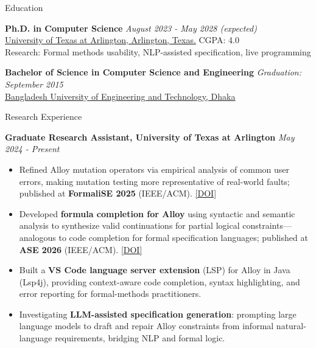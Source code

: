 \documentclass{resume} %
\begin{document}
\begin{rSection}{Education}

{\bf Ph.D. in Computer Science} \hfill {\em August 2023 - May 2028 (expected)}
\\ \href{https://www.uta.edu/academics/schools-colleges/engineering/academics/departments/cse}{University of Texas at Arlington, Arlington, Texas.} \hfill {CGPA: 4.0}
\\ Research: Formal methods usability, NLP-assisted specification, live programming

{\bf Bachelor of Science in Computer Science and Engineering} \hfill {\em Graduation: September 2015}
\\ \href{https://www.buet.ac.bd/web/}{Bangladesh University of Engineering and Technology, Dhaka}

\end{rSection}

\begin{rSection}{Research Experience}

    {\bf Graduate Research Assistant, University of Texas at Arlington} \hfill {\em May 2024 - Present}
    \begin{itemize}[noitemsep]
        \item Refined Alloy mutation operators via empirical analysis of common user errors, making mutation testing more
              representative of real-world faults; published at \textbf{FormaliSE 2025} (IEEE/ACM).
              \href{https://doi.org/10.1109/FormaliSE66629.2025.00019}{[DOI]}
        \item Developed \textbf{formula completion for Alloy} using syntactic and semantic analysis to synthesize valid
              continuations for partial logical constraints---analogous to code completion for formal specification languages;
              published at \textbf{ASE 2026} (IEEE/ACM). \href{https://doi.org/10.1145/3832783.3837517}{[DOI]}
        \item Built a \textbf{VS Code language server extension} (LSP) for Alloy in Java (Lsp4j), providing context-aware
              code completion, syntax highlighting, and error reporting for formal-methods practitioners.
        \item Investigating \textbf{LLM-assisted specification generation}: prompting large language models to draft and
              repair Alloy constraints from informal natural-language requirements, bridging NLP and formal logic.
    \end{itemize}

\end{rSection}
\end{document}
